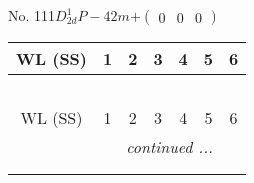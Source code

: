\documentclass[fleqn,9pt,landscape]{jsarticle}
\begin{document}
\newpage
No. 111\quad$D_{2d}^{1}$\quad$P-42m$\quad[ tetragonal ]\quad$+\begin{pmatrix} 0 & 0 & 0 \end{pmatrix}$
\begin{center}
\renewcommand{\arraystretch}{1.2}
\begin{longtable}{ccccccc}
 \hline \hline
WL (SS) & 1 & 2 & 3 & 4 & 5 & 6 \\ \hline \endfirsthead

\multicolumn{6}{l}{\tablename\ \thetable{}} \\
 \hline \hline
WL (SS) & 1 & 2 & 3 & 4 & 5 & 6 \\ \hline \endhead

 \hline \hline
\multicolumn{6}{r}{\footnotesize\it continued ...} \\ \endfoot

 \hline \hline
\multicolumn{6}{r}{} \\ \endlastfoot


\end{longtable}
\end{center}
\end{document}
